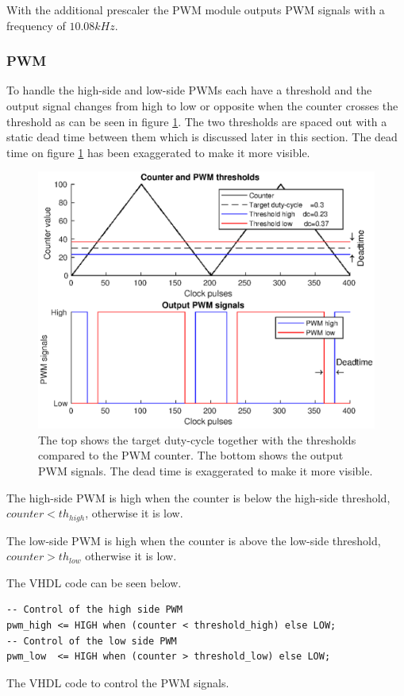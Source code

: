 With the additional prescaler the PWM module outputs PWM signals with a frequency of $10.08kHz$.

\subsubsection*{PWM}


To handle the high-side and low-side PWMs each have a threshold and the output signal changes from high to low or opposite when the counter crosses the threshold as can be seen in figure \ref{fig:counter_with_pwm}. The two thresholds are spaced out with a static dead time between them which is discussed later in this section. The dead time on figure \ref{fig:counter_with_pwm} has been exaggerated to make it more visible.

\begin{figure}[H]
	\centering
	\includegraphics[width=0.8 \textwidth]{pictures/software/counter_with_pwm.eps}
	\caption{The top shows the target duty-cycle together with the thresholds compared to the PWM counter. The bottom shows the output PWM signals. The dead time is exaggerated to make it more visible.}
	\label{fig:counter_with_pwm}
\end{figure}

The high-side PWM is high when the counter is below the high-side threshold, $counter < th_{high}$, otherwise it is low. 

The low-side PWM is high when the counter is above the low-side threshold, $counter > th_{low}$ otherwise it is low.

The VHDL code can be seen below.

\begin{verbatim}
-- Control of the high side PWM
pwm_high <= HIGH when (counter < threshold_high) else LOW;
-- Control of the low side PWM
pwm_low  <= HIGH when (counter > threshold_low) else LOW;
\end{verbatim}
\begin{center}
    The VHDL code to control the PWM signals.
\end{center}

